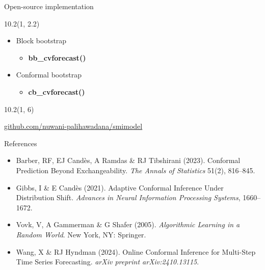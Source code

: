 \documentclass[
  12pt,
  ignorenonframetext,
  aspectratio=169,
]{beamer}
\begin{document}
\begin{frame}{Open-source implementation}
\label{open-source-implementation}

\begin{textblock}{10.2}(1, 2.2)
\fontsize{12}{14}\sf
\begin{block}{}
  \begin{itemize}
    \item Block bootstrap
    \begin{itemize}
      \item \color{violet} \textbf{bb\_cvforecast()} \newline
    \end{itemize}
    \item Conformal bootstrap
    \begin{itemize}
      \item \color{violet} \textbf{cb\_cvforecast()} \newline
    \end{itemize}
  \end{itemize}
\end{block}
\end{textblock}

\begin{textblock}{10.2}(1, 6)
\fontsize{11}{12}\sf
\begin{alertblock}{}
 \color{blue} \hspace*{0.8cm} \href{https://github.com/nuwani-palihawadana/smimodel}{github.com/nuwani-palihawadana/smimodel}
\end{alertblock}
\end{textblock}
\end{frame}

\begin{frame}{}
\label{section}
\end{frame}

\begin{frame}{References}
\label{references}
\begin{itemize}
    \item Barber, RF, EJ Candès, A Ramdas \& RJ Tibshirani (2023). Conformal Prediction Beyond Exchangeability. \textit{The Annals of Statistics} 51(2), 816–845.
    \item Gibbs, I \& E Candès (2021). Adaptive Conformal Inference Under Distribution Shift. \textit{Advances in Neural Information Processing Systems}, 1660–1672.
    \item Vovk, V, A Gammerman \& G Shafer (2005). \textit{Algorithmic Learning in a Random World}. New York, NY: Springer.
    \item Wang, X \& RJ Hyndman (2024). Online Conformal Inference for Multi-Step Time Series Forecasting. \textit{arXiv preprint arXiv:2410.13115}.
\end{itemize}
\end{frame}
\end{document}
